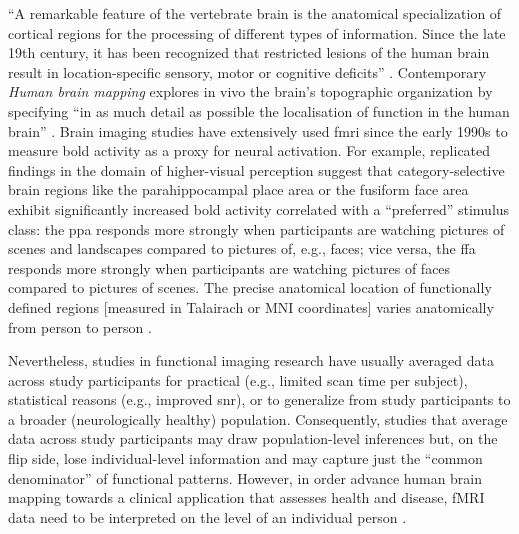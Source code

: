 




``A remarkable feature of the vertebrate brain is the anatomical specialization
of cortical regions for the processing of different types of information. Since
the late 19th century, it has been recognized that restricted lesions of the
human brain result in location-specific sensory, motor or cognitive deficits''
\citep{cohen1994localization}.
Contemporary \textit{Human brain mapping} \citep[e.g.,][]{raichle2009brief}
explores in vivo the brain's topographic organization
\citep[e.g.,][]{eickhoff2018topographic} by specifying ``in as much detail as
possible the localisation of function in the human brain''
\citep{savoy2001history}.
Brain imaging studies have extensively used \ac{fmri} since the early 1990s to
measure \ac{bold} activity as a proxy for neural activation.
For example, replicated findings in the domain of higher-visual perception
suggest that category-selective brain regions like the parahippocampal place
area \citep{epstein1998ppa, epstein1999parahippocampal} or the fusiform face
area \citep{kanwisher1997ffa, kanwisher2006fusiform} exhibit significantly
increased \ac{bold} activity correlated with a ``preferred'' stimulus class:
%
the \ac{ppa} responds more strongly when participants are watching pictures of
scenes and landscapes compared to pictures of, e.g., faces;
%
vice versa, the \ac{ffa} responds more strongly when participants are watching
pictures of faces compared to pictures of scenes.
%
The precise anatomical location of functionally defined regions [measured in
Talairach or MNI coordinates] varies anatomically from person to person
\citep{friston2006critique, saxe2006divide}.

%
Nevertheless, studies in functional imaging research have usually averaged data
across study participants for
%
practical (e.g., limited scan time per subject),
%
statistical reasons (e.g., improved \ac{snr}),
%
or to generalize from study participants to a broader (neurologically healthy)
population.
%
Consequently, studies that average data across study participants may draw
population-level inferences but, on the flip side, lose individual-level
information and may capture just the ``common denominator''
\citep{pinel2007fast} of functional patterns.
%
However, in order advance human brain mapping towards a clinical application
that assesses health and disease, fMRI data need to be interpreted on the level
of an individual person \citep{dubois2016building, wegrzyn2018thought}.



